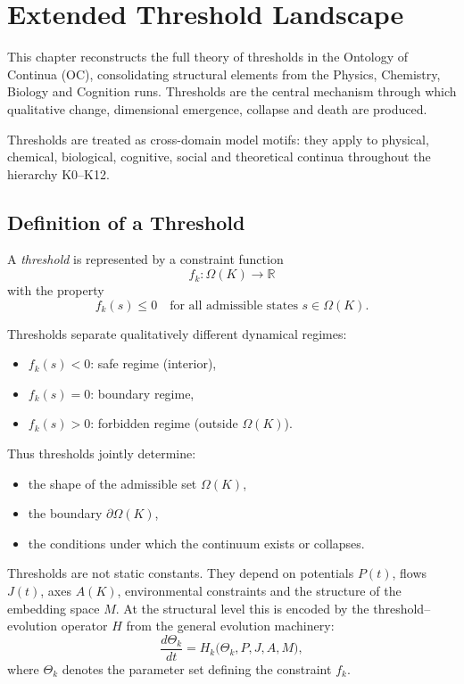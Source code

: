 
\section{Extended Threshold Landscape}
\label{sec:thresholds-extended}

This chapter reconstructs the full theory of thresholds in the Ontology of
Continua (OC), consolidating structural elements from the Physics, Chemistry,
Biology and Cognition runs. Thresholds are the central mechanism through which
qualitative change, dimensional emergence, collapse and death are produced.

Thresholds are treated as cross-domain model motifs: they apply to physical, chemical, biological,
cognitive, social and theoretical continua throughout the hierarchy K0--K12.

\subsection{Definition of a Threshold}

A \emph{threshold} is represented by a constraint function
\[
   f_k : \Omega(K) \rightarrow \mathbb{R}
\]
with the property
\[
   f_k(s) \le 0
   \quad\text{for all admissible states } s\in\Omega(K).
\]

Thresholds separate qualitatively different dynamical regimes:
\begin{itemize}
    \item \( f_k(s) < 0 \): safe regime (interior),
    \item \( f_k(s) = 0 \): boundary regime,
    \item \( f_k(s) > 0 \): forbidden regime (outside \(\Omega(K)\)).
\end{itemize}

Thus thresholds jointly determine:
\begin{itemize}
    \item the shape of the admissible set \(\Omega(K)\),
    \item the boundary \(\partial\Omega(K)\),
    \item the conditions under which the continuum exists or collapses.
\end{itemize}

Thresholds are not static constants.
They depend on potentials \(P(t)\), flows \(J(t)\), axes \(A(K)\), environmental
constraints and the structure of the embedding space \(M\).
At the structural level this is encoded by the threshold–evolution operator
\(H\) from the general evolution machinery:
\[
  \frac{d\Theta_k}{dt}
   = H_k\big(\Theta_k, P, J, A, M\big),
\]
where \(\Theta_k\) denotes the parameter set defining the constraint \(f_k\).

